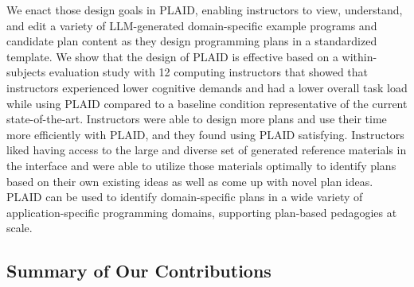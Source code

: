 We enact those design goals in PLAID, enabling instructors to view, understand, and edit a variety of LLM-generated domain-specific example programs and candidate plan content as they design programming plans in a standardized template. We show that the design of PLAID is effective based on a within-subjects evaluation study with 12 computing instructors that showed that instructors experienced lower cognitive demands and had a lower overall task load while using PLAID compared to a baseline condition representative of the current state-of-the-art. Instructors were able to design more plans and use their time more efficiently with PLAID, and they found using PLAID satisfying. Instructors liked having access to the large and diverse set of generated reference materials in the interface and were able to utilize those materials optimally to identify plans based on their own existing ideas as well as come up with novel plan ideas.
PLAID can be used to identify domain-specific plans in a wide variety of application-specific programming domains, supporting plan-based pedagogies at scale.


\subsection{Summary of Our Contributions}



